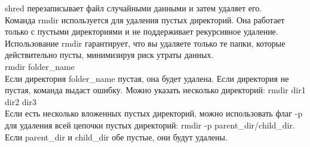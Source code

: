 shred перезаписывает файл случайными данными и затем удаляет его. \\
Команда rmdir используется для удаления пустых директорий. Она работает только с пустыми директориями и не поддерживает рекурсивное удаление. Использование rmdir гарантирует, что вы удаляете только те папки, которые действительно пусты, минимизируя риск утраты данных. \\
rmdir folder\_name \\
Если директория folder\_name пустая, она будет удалена. Если директория не пустая, команда выдаст ошибку. Можно указать несколько директорий: rmdir dir1 dir2 dir3 \\
Если есть несколько вложенных пустых директорий, можно использовать флаг -p для удаления всей цепочки пустых директорий: rmdir -p parent\_dir/child\_dir. Если parent\_dir и child\_dir обе пустые, они будут удалены.
